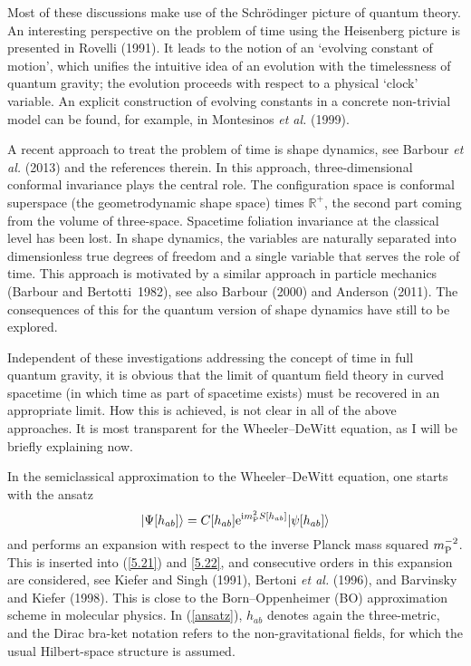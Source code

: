 \documentclass[12pt]{article}
\newcommand{\be}{\begin{equation}}
\newcommand{\ee}{\end{equation}}
\newcommand{\lb}{\label}
\newcommand{\E}{{\rm e}}
\newcommand{\I}{{\rm i}}
\begin{document}
Most of these discussions make use of the Schr\"odinger picture of
quantum theory. An interesting perspective on the problem of time
using the Heisenberg picture is presented in Rovelli (1991). It leads
to the notion of an `evolving constant of motion', which unifies the
intuitive idea of an evolution with the timelessness of quantum
gravity; the evolution proceeds with respect to a physical `clock'
variable. An explicit construction of evolving constants in a concrete
non-trivial model can be found, for example, in Montesinos {\em et
  al.} (1999).

A recent approach to treat the problem of time is shape dynamics, see
Barbour {\em et al.} (2013) and the references therein. In this
approach, three-dimensional conformal invariance plays the central
role. The configuration space is conformal superspace (the
geometrodynamic shape space) times ${\mathbb R}^+$, the second part
coming from the volume of three-space. Spacetime foliation invariance
at the classical level has been lost. In shape dynamics, the variables
are naturally separated into dimensionless true degrees of freedom and
a single variable that serves the role of time. This approach is
motivated by a similar approach in particle mechanics (Barbour and
Bertotti~1982), see also Barbour (2000) and Anderson (2011). The
consequences of this for the quantum version of 
shape dynamics have still to be explored. 

Independent of these investigations addressing the concept of time
in full quantum gravity, it is obvious that the limit of quantum field
theory in curved spacetime (in which time as part of spacetime exists)
must be recovered in an appropriate limit. How this is achieved, is
not clear in all of the above approaches. It is most transparent for
the Wheeler--DeWitt equation, as I will be briefly explaining now.

In the semiclassical approximation to the Wheeler--DeWitt equation,
one starts with the ansatz
\be
\lb{ansatz}
        \vert\Psi[h_{ab}]\rangle=C[h_{ab}]
        \E^{\I m_{\rm P}^2S[h_{ab}]}|\psi [h_{ab}]\rangle
\ee
and performs an expansion with respect to the inverse Planck mass squared
$m_{\rm P}^{-2}$. This is inserted into (\ref{5.21}) and \eqref{5.22},
and consecutive 
orders in this expansion are considered, see Kiefer and Singh (1991),
Bertoni {\em et al.} (1996),
and Barvinsky and Kiefer (1998). This is 
close to the Born--Oppenheimer (BO) approximation scheme in
molecular physics. 
In (\ref{ansatz}), $h_{ab}$ denotes again the three-metric, and the Dirac
bra-ket notation refers to the non-gravitational fields, for which the
usual Hilbert-space structure is assumed.
\end{document}
